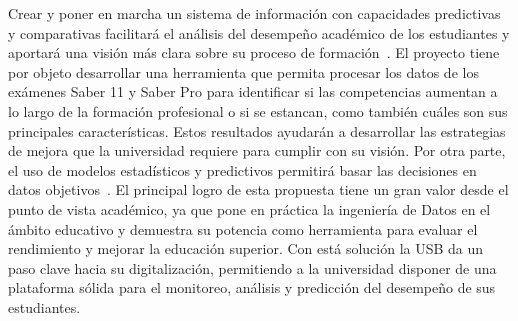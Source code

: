 Crear y poner en marcha un sistema de información con capacidades predictivas y comparativas facilitará el análisis del desempeño académico de los estudiantes y aportará una visión más clara sobre su proceso de formación~\cite{granados2025modelado}. El proyecto tiene por objeto desarrollar una herramienta que permita procesar los datos de los exámenes Saber 11 y Saber Pro para identificar si las competencias aumentan a lo largo de la formación profesional o si se estancan, como también cuáles son sus principales características. Estos resultados ayudarán a desarrollar las estrategias de mejora que la universidad requiere para cumplir con su visión.
Por otra parte, el uso de modelos estadísticos y predictivos permitirá basar las decisiones en datos objetivos~\cite{tobon2013formacion}. El principal logro de esta propuesta tiene un gran valor desde el punto de vista académico, ya que pone en práctica la ingeniería de Datos en el ámbito educativo y demuestra su potencia como herramienta para evaluar el rendimiento y mejorar la educación superior. Con está solución la USB da un paso clave hacia su digitalización, permitiendo a la universidad disponer de una plataforma sólida para el monitoreo, análisis y predicción del desempeño de sus estudiantes.

